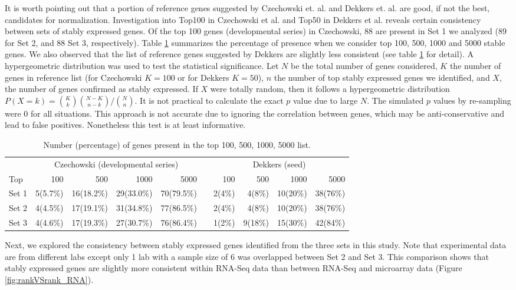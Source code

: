 \documentclass[11pt, a4paper]{article}
\begin{document}
It is worth pointing out that a  portion of reference genes suggested by Czechowski et. al. and Dekkers et. al. are good, if not the best,  candidates for normalization. Investigation into Top100 in Czechowski et al. and Top50 in Dekkers et al. reveals certain consistency between sets of stably expressed genes. Of the top 100 genes (developmental series) in  Czechowski, 88 are present in Set 1 we analyzed (89 for Set 2, and 88  Set 3, respectively). Table \ref{table:stablegenerank} summarizes the percentage of presence when we consider top 100, 500, 1000 and 5000 stable genes.  We also observed that the list of reference genes suggested by Dekkers are slightly less consistent (see table \ref{table:stablegenerank} for detail). A hypergeometric distribution was used to test the statistical significance. Let $N$ be the total number of genes considered, $K$ the number of genes in reference list (for Czechowski $K=100$ or for Dekkers $K=50$), $n$ the number of top stably expressed genes we identified,  and $X$, the number of genes confirmed as stably expressed.  If $X$ were totally random, then it follows a hypergeometric distribution $P(X = k) = {K \choose k}{N-K \choose n-k}/{N\choose n}$. It is not practical to calculate the exact $p$ value due to large $N$. The simulated $p$ values by re-sampling  were 0 for all situations. This approach is not accurate due to ignoring the correlation between genes, which may be anti-conservative and lead to false positives. Nonetheless this test is at least informative.  
\begin{table}[ht]
\label{table:stablegenerank}
\begin{tabular}{lrrrr r rrrr} \hline
 & \multicolumn{4}{c}{Czechowski (developmental series)} & & \multicolumn{4}{c}{Dekkers (seed)} \\ \cmidrule(r){2-10}
Top   &   100  & 500     & 1000     & 5000  &  & 100    & 500    & 1000    & 5000    \\ \hline
Set 1 &  5(5.7\%)   & 16(18.2\%)  & 29(33.0\%)  &70(79.5\%)  & &2(4\%)  &  4(8\%)  &10(20\%) & 38(76\%)   \\
Set 2 & 4(4.5\%)    &17(19.1\%)   & 31(34.8\%)  &77(86.5\%) & &2(4\%)  &  4(8\%)  &10(20\%) & 38(76\%)   \\
Set 3 &4(4.6\%)     &17(19.3\%)   &27(30.7\%)   &76(86.4\%) &  &1(2\%) & 9(18\%) &15(30\%)  & 42(84\%) \\ \hline 
\end{tabular}
\caption{Number (percentage) of genes present in the top 100, 500, 1000, 5000 list. }
\end{table}
Next, we explored the consistency between stably expressed genes identified from the three sets in this study. Note that experimental data are from different labs except only 1 lab with a sample size of 6 was overlapped between Set 2 and Set 3. This comparison shows that stably expressed genes are slightly more consistent within RNA-Seq data than between RNA-Seq and microarray data (Figure \ref{fig:rankVSrank_RNA}). %
\end{document}
